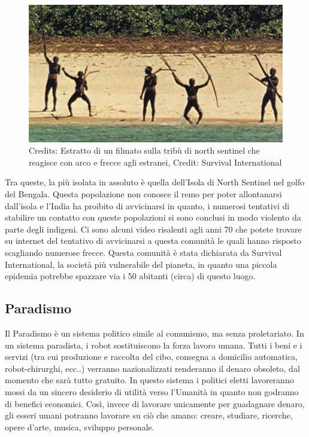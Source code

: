 \begin{figure}
  \centering
  \includegraphics[width=0.95\linewidth]{images/Libro-img044.jpg}
  \begin{minipage}{\linewidth}
    \caption{Credits: Estratto di un filmato sulla tribù di north
sentinel che reagisce con arco e frecce agli estranei, Credit: Survival International}
  \end{minipage}
\end{figure}

Tra queste, la più isolata in assoluto è quella dell'Isola di North Sentinel nel golfo del Bengala.
Questa popolazione non conosce il remo per poter allontanarsi dall'isola e
l'India ha proibito di avvicinarsi in quanto, i numerosi tentativi di stabilire un contatto con
queste popolazioni si sono conclusi in modo violento da parte degli indigeni. Ci sono alcuni video risalenti agli anni
70 che potete trovare su internet del tentativo di avvicinarsi a questa comunità le quali hanno risposto scagliando
numerose frecce. Questa comunità è stata dichiarata da Survival International, la società più vulnerabile del pianeta,
in quanto una piccola epidemia potrebbe spazzare via i 50 abitanti (circa) di questo luogo.

\subsection{Paradismo}
Il Paradismo è un sistema politico simile al comunismo, ma senza proletariato. In un sistema paradista, i robot
sostituiscono la forza lavoro umana. Tutti i beni e i servizi (tra cui produzione e raccolta del cibo, consegna a
domicilio automatica, robot-chirurghi, ecc..) verranno nazionalizzati renderanno il denaro obsoleto, dal momento che
sarà tutto gratuito. In questo sistema i politici eletti lavoreranno mossi da un sincero desiderio di utilità verso
l'Umanità in quanto non godranno di benefici economici. Così, invece di lavorare unicamente per guadagnare denaro, gli
esseri umani potranno lavorare su ciò che amano: creare, studiare, ricerche, opere d'arte, musica, sviluppo
personale.

